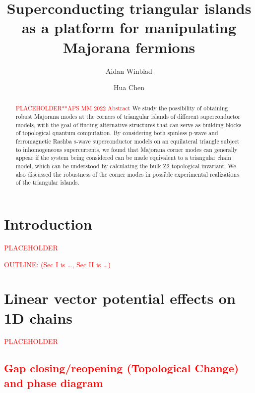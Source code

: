 \documentclass[aps,prb,showpacs,amsmath,amssymb,superscriptaddress]{revtex4-2}
\newcommand{\Red}[1]{\textcolor{red}{#1}}
\begin{document}
\title{Superconducting triangular islands as a platform for manipulating Majorana fermions}

\author{Aidan Winblad}

\author{Hua Chen}

\maketitle

\begin{abstract}
  \Red{PLACEHOLDER**APS MM 2022 Abstract}
  We study the possibility of obtaining robust Majorana modes at the corners of triangular islands of different superconductor models, with the goal of finding alternative structures that can serve as building blocks of topological quantum computation.
  By considering both spinless p-wave and ferromagnetic Rashba s-wave superconductor models on an equilateral triangle subject to inhomogeneous supercurrents, we found that Majorana corner modes can generally appear if the system being considered can be made equivalent to a triangular chain model, which can be understood by calculating the bulk Z2 topological invariant.
  We also discussed the robustness of the corner modes in possible experimental realizations of the triangular islands.
\end{abstract}


\section{Introduction}
\Red{PLACEHOLDER}


\Red{OUTLINE: (Sec I is \dots, Sec II is \dots)}
\section{Linear vector potential effects on 1D chains}

\Red{PLACEHOLDER}

\subsection{\Red{Gap closing/reopening (Topological Change) and phase diagram}}
\end{document}

